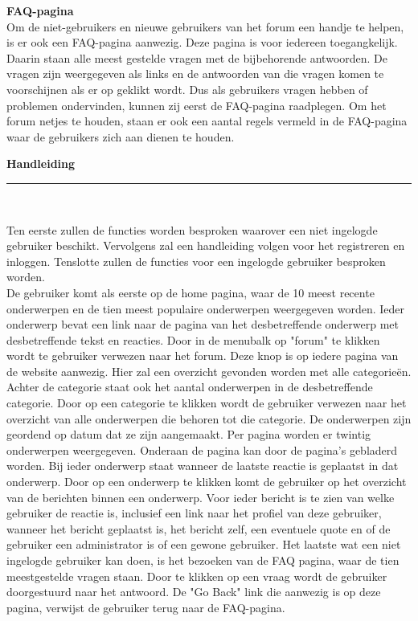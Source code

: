 \documentclass[a4paper,12pt]{article}
\newcommand{\HRule}{\rule{\linewidth}{0.5mm}}
\begin{document}
{\bfseries FAQ-pagina}\\
Om de niet-gebruikers en nieuwe gebruikers van het forum een handje te helpen, is er ook een FAQ-pagina aanwezig. Deze pagina is voor iedereen toegangkelijk. Daarin staan alle meest gestelde vragen met de bijbehorende antwoorden. De vragen zijn weergegeven als links en de antwoorden van die vragen komen te voorschijnen als er op geklikt wordt. Dus als gebruikers vragen hebben of problemen ondervinden, kunnen zij eerst de FAQ-pagina raadplegen. Om het forum netjes te houden, staan er ook een aantal regels vermeld in de FAQ-pagina waar de gebruikers zich aan dienen te houden.






\newpage
\begin{center}
{ \LARGE \bfseries Handleiding}\\[0.1cm]
\HRule \\[0.5cm]
\end{center}
Ten eerste zullen de functies worden besproken waarover een niet ingelogde gebruiker beschikt. Vervolgens zal een handleiding volgen voor het registreren en inloggen. Tenslotte zullen de functies voor een ingelogde gebruiker besproken worden.\\
De gebruiker komt als eerste op de home pagina, waar de 10 meest recente onderwerpen en de tien meest populaire onderwerpen weergegeven worden. Ieder onderwerp bevat een link naar de pagina van het desbetreffende onderwerp met desbetreffende tekst en reacties.
Door in de menubalk op "forum" te klikken wordt te gebruiker verwezen naar het forum. Deze knop is op iedere pagina van de website aanwezig. Hier zal een overzicht gevonden worden met alle categorie\"en.  Achter de categorie staat ook het aantal onderwerpen in de desbetreffende categorie. Door op een categorie te klikken wordt de gebruiker verwezen naar het overzicht van alle onderwerpen die behoren tot die categorie. De onderwerpen zijn geordend op datum dat ze zijn aangemaakt. Per pagina worden er twintig onderwerpen weergegeven. Onderaan de pagina kan door de pagina's gebladerd worden. Bij ieder onderwerp staat wanneer de laatste reactie is geplaatst in dat onderwerp. Door op een onderwerp te klikken komt de gebruiker op het overzicht van de berichten binnen een onderwerp. Voor ieder bericht is te zien van welke gebruiker de reactie is, inclusief een link naar het profiel van deze gebruiker, wanneer het bericht geplaatst is, het bericht zelf, een eventuele quote en of de gebruiker een administrator is of een gewone gebruiker. Het laatste wat een niet ingelogde gebruiker kan doen, is het bezoeken van de FAQ pagina, waar de tien meestgestelde vragen staan. Door te klikken op een vraag wordt de gebruiker doorgestuurd naar het antwoord. De "Go Back" link die aanwezig is op deze pagina, verwijst de gebruiker terug naar de FAQ-pagina.\\
\end{document}
